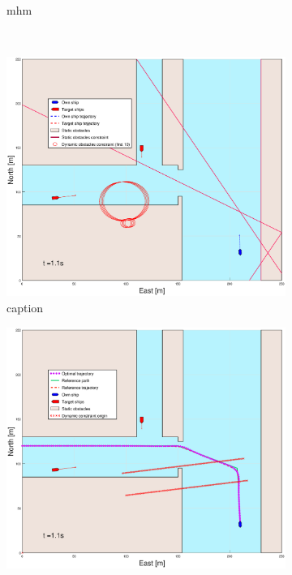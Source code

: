 \begin{figure}[!b]
\begin{subfigure}[b]{0.499\textwidth}
        \caption{mhm}
    \end{subfigure}
    \hfill
    \\
    \begin{subfigure}[b]{0.49\textwidth}
        \centering
        \includegraphics[width=\textwidth]{Images/Figures/Havn1/_Simple_1fig1_time=1}
        \caption{caption}
    \end{subfigure}
    \hfill
    \begin{subfigure}[b]{0.499\textwidth}
        \centering
        \includegraphics[width=\textwidth]{Images/Figures/Havn1/_Simple_1fig999_time=1}

\end{subfigure}
\end{figure}
